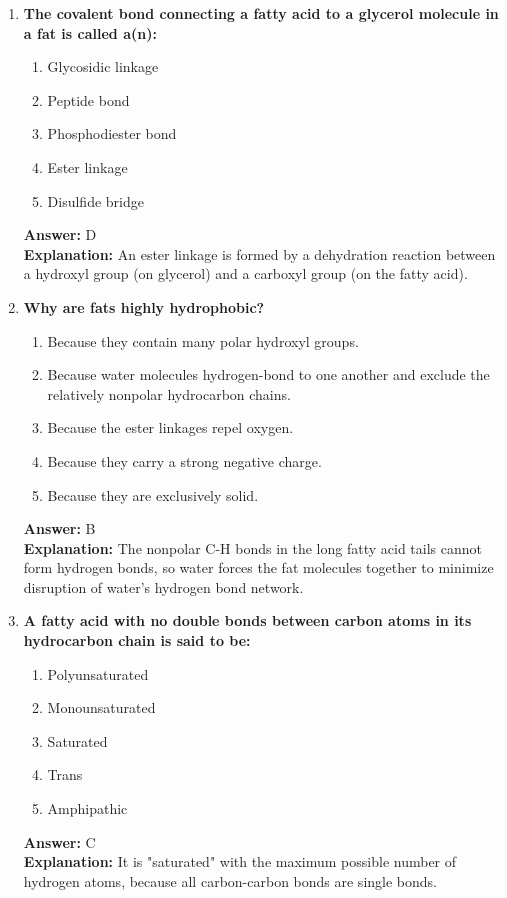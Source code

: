 \documentclass[11pt, a4paper]{article}
\begin{document}
\begin{enumerate}
\item \textbf{The covalent bond connecting a fatty acid to a glycerol molecule in a fat is called a(n):}
\begin{enumerate}[label=\Alph*.]
    \item Glycosidic linkage
    \item Peptide bond
    \item Phosphodiester bond
    \item Ester linkage
    \item Disulfide bridge
\end{enumerate}
\textbf{Answer:} D \\
\textbf{Explanation:} An ester linkage is formed by a dehydration reaction between a hydroxyl group (on glycerol) and a carboxyl group (on the fatty acid).

\item \textbf{Why are fats highly hydrophobic?}
\begin{enumerate}[label=\Alph*.]
    \item Because they contain many polar hydroxyl groups.
    \item Because water molecules hydrogen-bond to one another and exclude the relatively nonpolar hydrocarbon chains.
    \item Because the ester linkages repel oxygen.
    \item Because they carry a strong negative charge.
    \item Because they are exclusively solid.
\end{enumerate}
\textbf{Answer:} B \\
\textbf{Explanation:} The nonpolar C-H bonds in the long fatty acid tails cannot form hydrogen bonds, so water forces the fat molecules together to minimize disruption of water's hydrogen bond network.

\item \textbf{A fatty acid with no double bonds between carbon atoms in its hydrocarbon chain is said to be:}
\begin{enumerate}[label=\Alph*.]
    \item Polyunsaturated
    \item Monounsaturated
    \item Saturated
    \item Trans
    \item Amphipathic
\end{enumerate}
\textbf{Answer:} C \\
\textbf{Explanation:} It is "saturated" with the maximum possible number of hydrogen atoms, because all carbon-carbon bonds are single bonds.


\end{enumerate}
\end{document}
